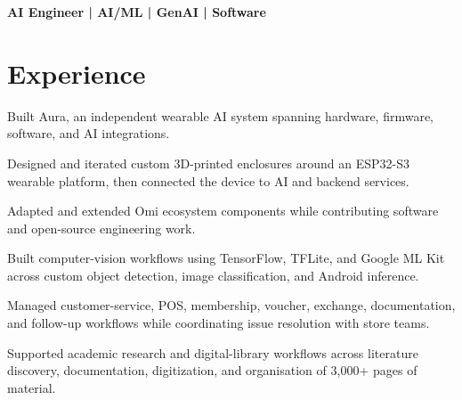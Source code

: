 \documentclass{../../templates/1/resume}
\begin{document}


{\small\bfseries AI Engineer | AI/ML | GenAI | Software}\par\vspace{2pt}

\section{Experience}
\begin{resumeitemize}
\item Built Aura, an independent wearable AI system spanning hardware, firmware, software, and AI integrations.
\item Designed and iterated custom 3D-printed enclosures around an ESP32-S3 wearable platform, then connected the device to AI and backend services.
\item Adapted and extended Omi ecosystem components while contributing software and open-source engineering work.
\end{resumeitemize}

\begin{resumeitemize}
\item Built computer-vision workflows using TensorFlow, TFLite, and Google ML Kit across custom object detection, image classification, and Android inference.
\end{resumeitemize}

\begin{resumeitemize}
\item Managed customer-service, POS, membership, voucher, exchange, documentation, and follow-up workflows while coordinating issue resolution with store teams.
\end{resumeitemize}

\begin{resumeitemize}
\item Supported academic research and digital-library workflows across literature discovery, documentation, digitization, and organisation of 3,000+ pages of material.
\end{resumeitemize}
\end{document}

